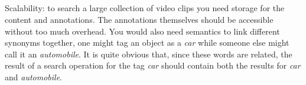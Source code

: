 \subsection[Given the annotation and retrieval functionality of the application written, what are some of the (engineering/user) problems that you foresee when you would deploy this application in the real world?]{}
Scalability: to search a large collection of video clips you need storage for the content and annotations. The annotations themselves should be accessible without too much overhead. You would also need semantics to link different synonyms together, one might tag an object as a \emph{car} while someone else might call it an \emph{automobile}. It is quite obvious that, since these words are related, the result of a search operation for the tag \emph{car} should contain both the results for \emph{car} and \emph{automobile}.